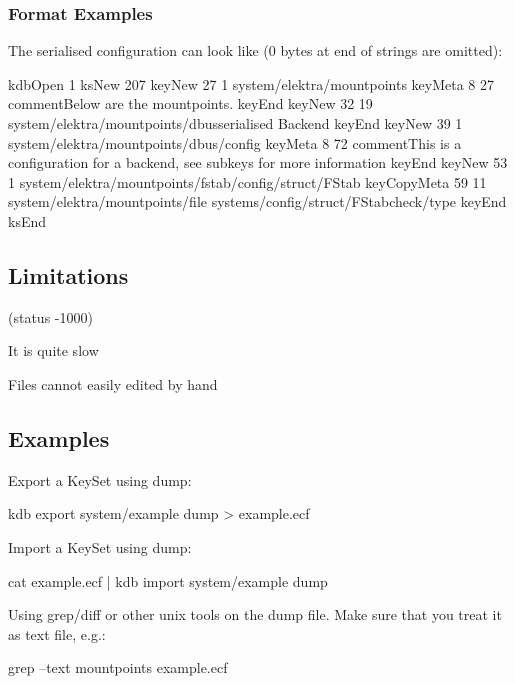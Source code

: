 \subsubsection*{Format Examples}

The serialised configuration can look like (0 bytes at end of strings are omitted)\+: \begin{DoxyVerb}    kdbOpen 1               
    ksNew 207               
    keyNew 27 1             
    system/elektra/mountpoints               
    keyMeta 8 27            
    commentBelow are the mountpoints.                
    keyEnd          
    keyNew 32 19             
    system/elektra/mountpoints/dbusserialised Backend               
    keyEnd keyNew 39 1              
    system/elektra/mountpoints/dbus/config          
    keyMeta 8 72            
    commentThis is a configuration for a backend, see subkeys for more information          
    keyEnd          
    keyNew 53 1             
    system/elektra/mountpoints/fstab/config/struct/FStab            
    keyCopyMeta 59 11               
    system/elektra/mountpoints/file                 
    systems/config/struct/FStabcheck/type           
    keyEnd          
    ksEnd           
\end{DoxyVerb}


\subsection*{Limitations}

(status -\/1000)


\begin{DoxyItemize}
\item It is quite slow
\item Files cannot easily edited by hand
\end{DoxyItemize}

\subsection*{Examples}

Export a Key\+Set using {\ttfamily dump}\+: \begin{DoxyVerb}    kdb export system/example dump > example.ecf
\end{DoxyVerb}


Import a Key\+Set using {\ttfamily dump}\+: \begin{DoxyVerb}    cat example.ecf | kdb import system/example dump
\end{DoxyVerb}


Using grep/diff or other unix tools on the dump file. Make sure that you treat it as text file, e.\+g.\+: \begin{DoxyVerb}    grep --text mountpoints example.ecf\end{DoxyVerb}
 